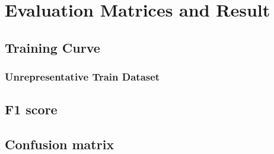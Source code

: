 \chapter{Evaluation Matrices and Result} 
\label{evaluation} 

\section{Training Curve}
\subsection{Unrepresentative Train Dataset}
\section{F1 score}
\section{Confusion matrix}